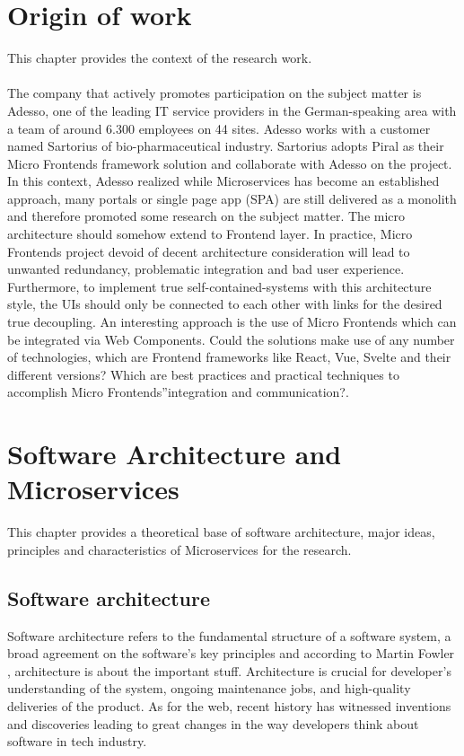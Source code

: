 \documentclass[a4paper]{book}
\begin{document}
\chapter{Origin of work}
This chapter provides the context of the research work.
\\ \\
The company that actively promotes participation on the subject matter is Adesso, one of the leading IT service providers in the German-speaking area with a team of around 6.300 employees on 44 sites. Adesso works with a customer named Sartorius of bio-pharmaceutical industry. Sartorius adopts Piral as their Micro Frontends framework solution and collaborate with Adesso on the project. In this context, Adesso realized while Microservices has become an established approach, many portals or single page app (SPA) are still delivered as a monolith and therefore promoted some research on the subject matter. The micro architecture should somehow extend to Frontend layer. In practice, Micro Frontends project devoid of decent architecture consideration will lead to unwanted redundancy, problematic integration and bad user experience. Furthermore, to implement true self-contained-systems with this architecture style, the UIs should only be connected to each other with links for the desired true decoupling. An interesting approach is the use of Micro Frontends which can be integrated via Web Components. Could the solutions make use of any number of technologies, which are Frontend frameworks like React, Vue, Svelte and their different versions? Which are best practices and practical techniques to accomplish Micro Frontends”integration and communication?.


\chapter{Software Architecture and Microservices}
This chapter provides a theoretical base of software architecture, major ideas, principles and characteristics of Microservices for the research.
\section{Software architecture}
Software architecture refers to the fundamental structure of a software system, a broad agreement on the software's key principles and according to Martin Fowler \cite{SA}, architecture is about the important stuff. Architecture is crucial for developer's understanding of the system, ongoing maintenance jobs,  and high-quality deliveries of the product. As for the web, recent history has witnessed inventions and discoveries leading to great changes in the way developers think about software in tech industry.
\end{document}
